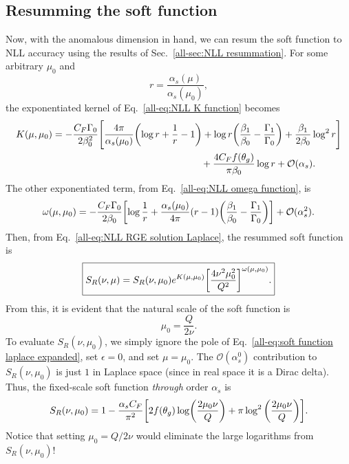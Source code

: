 \documentclass[../thesis.tex]{subfiles}
\providecommand{\cO}{\mathcal{O}}
\begin{document}
\subsection{Resumming the soft function}
	Now, with the anomalous dimension in hand, we can resum the soft function to NLL accuracy using the results of Sec.~\ref{all-sec:NLL resummation}. For some arbitrary $\mu_0$ and
	\begin{equation}
		r = \frac{\alpha_s (\mu)}{\alpha_s (\mu_0)},
	\end{equation}
	the exponentiated kernel of Eq.~\ref{all-eq:NLL K function} becomes
	\begin{equation}
	\begin{aligned}
		K(\mu, \mu_0) = -\frac{C_F \Gamma_0}{2\beta_0^2}\Bigg[\frac{4\pi}{\alpha_s(\mu_0)} \qty(\log r + \frac{1}{r} - 1) + \log r \qty(\frac{\beta_1}{\beta_0} - \frac{\Gamma_1}{\Gamma_0}) &+ \frac{\beta_1}{2\beta_0}\log^2 r \Bigg] \\
		&\hspace{-3cm}+ \frac{4 C_F f(\theta_g)}{\pi \beta_0} \log r + \cO(\alpha_s).
	\end{aligned}
	\end{equation}
	The other exponentiated term, from Eq.~\ref{all-eq:NLL omega function}, is
	\begin{equation}
	\begin{aligned}
		\omega(\mu, \mu_0) = -\frac{C_F \Gamma_0}{2\beta_0}\qty[\log \frac{1}{r} + \frac{\alpha_s(\mu_0)}{4\pi}(r - 1)\qty(\frac{\beta_1}{\beta_0} - \frac{\Gamma_1}{\Gamma_0})] + \cO(\alpha_s^2).
	\end{aligned}
	\end{equation}
	Then, from Eq.~\ref{all-eq:NLL RGE solution Laplace}, the resummed soft function is
	\begin{equation}\label{all-eq:NLL soft function Laplace}
	\boxed{
		S_R(\nu, \mu) = S_R(\nu, \mu_0) e^{K(\mu, \mu_0)} \qty[\frac{4\nu^2\mu_0^2}{Q^2}]^{\omega(\mu, \mu_0)}.
	}
	\end{equation}
	From this, it is evident that the natural scale of the soft function is
	\begin{equation}\label{all-eq:mu0 natural value}
		\mu_0 = \frac{Q}{2\nu}.
	\end{equation}
	To evaluate $S_R(\nu, \mu_0)$, we simply ignore the pole of Eq.~\ref{all-eq:soft function laplace expanded}, set $\epsilon = 0$, and set $\mu = \mu_0$. The $\cO(\alpha_s^0)$ contribution to $S_R(\nu, \mu_0)$ is just $1$ in Laplace space (since in real space it is a Dirac delta). Thus, the fixed-scale soft function \textit{through} order $\alpha_s$ is
	\begin{equation}
		S_R(\nu, \mu_0) = 1 - \frac{\alpha_s C_F}{\pi^2}\qty[2f(\theta_g)\log(\frac{2\mu_0 \nu}{Q}) + \pi \log^2\qty(\frac{2\mu_0 \nu}{Q})].
	\end{equation}
	Notice that setting $\mu_0 = Q/2\nu$ would eliminate the large logarithms from $S_R(\nu, \mu_0)$!
\end{document}
